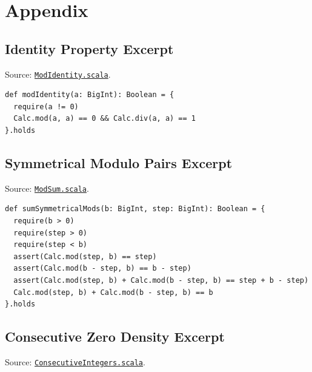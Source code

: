 \section{Appendix}
\label{sec:appendix}

\subsection{Identity Property Excerpt}
\label{sec:appendix-identity}

Source:
\href{https://github.com/thiagomata/prime-numbers/blob/modulo-article-v1.0.0/src/main/scala/v1/chapter2/div/properties/ModIdentity.scala}{\texttt{ModIdentity.scala}}.

\begin{lstlisting}[style=scala]
def modIdentity(a: BigInt): Boolean = {
  require(a != 0)
  Calc.mod(a, a) == 0 && Calc.div(a, a) == 1
}.holds
\end{lstlisting}

\subsection{Symmetrical Modulo Pairs Excerpt}
\label{sec:appendix-symmetrical}

Source:
\href{https://github.com/thiagomata/prime-numbers/blob/modulo-article-v1.0.0/src/main/scala/v1/chapter2/div/properties/ModSum.scala}{\texttt{ModSum.scala}}.

\begin{lstlisting}[style=scala]
def sumSymmetricalMods(b: BigInt, step: BigInt): Boolean = {
  require(b > 0)
  require(step > 0)
  require(step < b)
  assert(Calc.mod(step, b) == step)
  assert(Calc.mod(b - step, b) == b - step)
  assert(Calc.mod(step, b) + Calc.mod(b - step, b) == step + b - step)
  Calc.mod(step, b) + Calc.mod(b - step, b) == b
}.holds
\end{lstlisting}

\subsection{Consecutive Zero Density Excerpt}
\label{sec:appendix-zero-density}

Source:
\href{https://github.com/thiagomata/prime-numbers/blob/modulo-article-v1.0.0/src/main/scala/v1/chapter2/div/properties/ConsecutiveIntegers.scala}{\texttt{ConsecutiveIntegers.scala}}.

